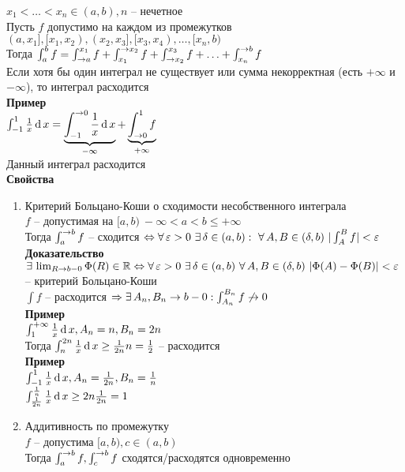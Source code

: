 \documentclass[12pt]{article}
\begin{document}
$x_1 < \ldots < x_n \in (a,b), n$ -- нечетное\\
Пусть $f$ допустимо на каждом из промежутков $(a, x_1], [x_1,x_2), (x_2, x_3], [x_3, x_4), \ldots, [x_n, b)$\\
Тогда $\int_a^b f = \int_{\rto a}^{x_1} f + \int_{x_1}^{\rto x_2} f + \int_{\rto x_2}^{x_3} f + \ldots + \int_{x_n}^{\rto b} f$\\
Если хотя бы один интеграл не существует или сумма некорректная (есть $+\infty$ и $-\infty$), то интеграл расходится\\
\textbf{Пример}\\
$\int_{-1}^1 \frac1x \df x = \ub{-\infty}{\int_{-1}^{\rto 0}\frac1x \df x} + \ub{+\infty}{\int_{\rto 0}^1 f}$\\
Данный интеграл расходится\\
\textbf{Свойства}
\begin{enumerate}
    \item Критерий Больцано-Коши о сходимости несобственного интеграла\\
    $f$ -- допустимая на $[a,b)\ -\infty < a < b \leq +\infty$\\
    Тогда $\int_a^{\rto b} f$ -- сходится $\LRto \fall \eps > 0\ \ex \delta \in (a,b):\ \fall A,B \in (\delta, b)\ |\int_A^B f| < \eps$\\
    \textbf{Доказательство}\\
    $\ex \lim_{R\rto b-0}\Phi(R) \in \Rset \LRto \fall \eps > 0\ \ex \delta \in (a,b)\ \fall A,B \in (\delta, b)\ |\Phi(A)-\Phi(B)| < \eps$ -- критерий Больцано-Коши\\
    $\int f$ -- расходится $\Rto \ex A_n, B_n \rto b-0: \int_{A_n}^{B_n} f \not\rto 0$\\
    \textbf{Пример}\\
    $\int_1^{+\infty} \frac1x \df x, A_n = n, B_n = 2n$\\
     Тогда $\int_n^{2n}\frac1x\df x \geq \frac1{2n}n = \frac12$ -- расходится\\
     \textbf{Пример}\\
     $\int_{-1}^1 \frac1x \df x, A_n = \frac1{2n}, B_n = \frac1n$\\
     $\int_{\frac1{2n}}^{\frac1n} \frac1x \df x \geq 2n\frac1{2n} = 1$
     \item Аддитивность по промежутку\\
     $f$ -- допустима $[a,b), c\in (a,b)$\\
     Тогда $\int_a^{\rto b} f, \int_c^{\rto b} f$ сходятся/расходятся одновременно\\

\end{enumerate}
\end{document}
